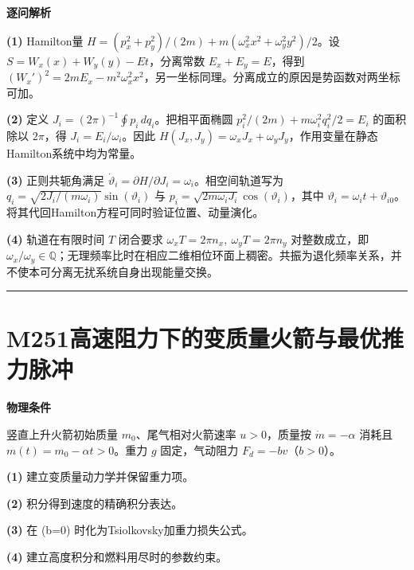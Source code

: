 \documentclass[UTF8,a4paper,11pt,oneside,openany]{ctexbook}
\begin{document}
\par\medskip\noindent\textbf{逐问解析}
\par\noindent\textbf{(1)} Hamilton量 \(H=(p_x^2+p_y^2)/(2m)+m(\omega_x^2x^2+\omega_y^2y^2)/2\)。设 \(S=W_x(x)+W_y(y)-Et\)，分离常数 \(E_x+E_y=E\)，得到 \((W_x')^2=2mE_x-m^2\omega_x^2x^2\)，另一坐标同理。分离成立的原因是势函数对两坐标可加。
\par\noindent\textbf{(2)} 定义 \(J_i=(2\pi)^{-1}\oint p_i\,dq_i\)。把相平面椭圆 \(p_i^2/(2m)+m\omega_i^2q_i^2/2=E_i\) 的面积除以 \(2\pi\)，得 \(J_i=E_i/\omega_i\)。因此 \(H(J_x,J_y)=\omega_xJ_x+\omega_yJ_y\)，作用变量在静态Hamilton系统中均为常量。
\par\noindent\textbf{(3)} 正则共轭角满足 \(\dot\vartheta_i=\partial H/\partial J_i=\omega_i\)。相空间轨道写为 \(q_i=\sqrt{2J_i/(m\omega_i)}\sin(\vartheta_i)\) 与 \(p_i=\sqrt{2m\omega_iJ_i}\cos(\vartheta_i)\)，其中 \(\vartheta_i=\omega_it+\vartheta_{i0}\)。将其代回Hamilton方程可同时验证位置、动量演化。
\par\noindent\textbf{(4)} 轨道在有限时间 \(T\) 闭合要求 \(\omega_xT=2\pi n_x,\ \omega_yT=2\pi n_y\) 对整数成立，即 \(\omega_x/\omega_y\in\mathbb Q\)；无理频率比时在相应二维相位环面上稠密。共振为退化频率关系，并不使本可分离无扰系统自身出现能量交换。

\par\bigskip\hrule\bigskip
\section*{M251\quad 高速阻力下的变质量火箭与最优推力脉冲}
\textbf{物理条件}\par 竖直上升火箭初始质量 \(m_0\)、尾气相对火箭速率 \(u>0\)，质量按 \(\dot m=-\alpha\) 消耗且 \(m(t)=m_0-\alpha t>0\)。重力 \(g\) 固定，气动阻力 \(F_d=-bv\)（\(b>0\)）。
\par\noindent\textbf{(1)} 建立变质量动力学并保留重力项。
\par\noindent\textbf{(2)} 积分得到速度的精确积分表达。
\par\noindent\textbf{(3)} 在 (b=0) 时化为Tsiolkovsky加重力损失公式。
\par\noindent\textbf{(4)} 建立高度积分和燃料用尽时的参数约束。
\end{document}
